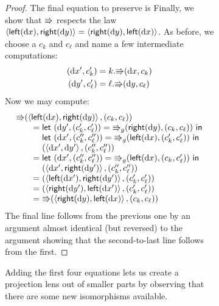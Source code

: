\begin{figure}
\begin{figure}
\begin{proof}
\ifdissertation
The final equation to preserve is
\else
Finally, we show that $\mathord{\Rrightarrow}$ respects the law
\fi
$\left<\mathsf{left}(\textrm{d} x),\mathsf{right}(\textrm{d} y)\right>=\left<\mathsf{right}(\textrm{d} y),\mathsf{left}(\textrm{d} x)\right>$.
As before, we choose a $c_k$ and $c_\ell$ and name a few intermediate
computations:
\begin{align*}
    (\textrm{d} x',c_k') &= k.\mathord{\Rrightarrow}(\textrm{d} x,c_k) \\
    (\textrm{d} y',c_\ell') &= \ell.\mathord{\Rrightarrow}(\textrm{d} y,c_\ell)
\end{align*}
Now we may compute:
\[\begin{array}{l}
\dputr(\blist\mlleft\dx\mlist\mlright\dy\elist,(c_k,c_\ell)) \\
    \qquad=
        \mllet (\dy',(c_k',c_\ell')) = \dputr\gen(\mlright\dy,(c_k,c_\ell)) \mline \\
    \qquad{\phantom{={}}}
        \mllet (\dx',(c_k'',c_\ell'')) = \dputr\gen(\mlleft\dx,(c_k',c_\ell')) \mline \\
    \qquad{\phantom{={}}}
        (\blist\dx'\mlist\dy'\elist,(c_k'',c_\ell'')) \\
    \qquad=
        \mllet (\dx',(c_k'',c_\ell'')) = \dputr\gen(\mlleft\dx,(c_k,c_\ell')) \mline \\
    \qquad{\phantom{={}}}
        (\blist\dx'\mlist\mlright{\dy'}\elist,(c_k'',c_\ell'')) \\
    \qquad=
        (\blist\mlleft{\dx'}\mlist\mlright{\dy'}\elist,(c_k',c_\ell')) \\
    \qquad=
        (\blist\mlright{\dy'}\mlist\mlleft{\dx'}\elist,(c_k',c_\ell')) \\
    \qquad=
        \dputr(\blist\mlright\dy\mlist\mlleft\dx\elist,(c_k,c_\ell))
\end{array}\]
The final line follows from the previous one by an argument almost identical
(but reversed) to the argument showing that the second-to-last line follows
from the first.
\end{proof}

Adding the first four equations lets us create a projection lens
out of smaller parts by observing that there are some new isomorphisms
available.
\iffull


\end{figure}
\end{figure}
